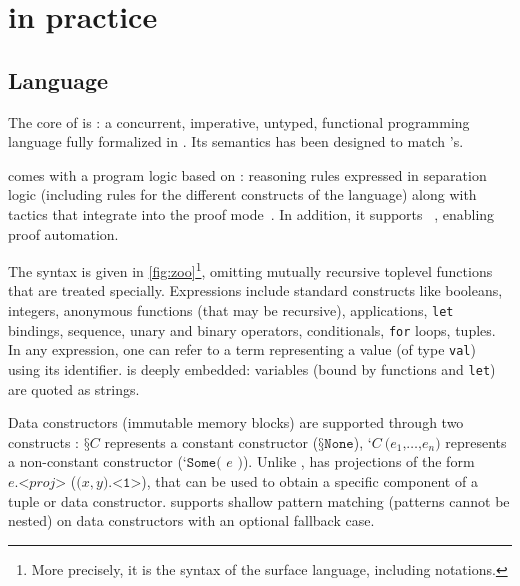 \section{\Zoo in practice}
\label{sec:zoo}




\subsection{Language}

The core of \Zoo is \ZooLang: a concurrent, imperative, untyped, functional programming language fully formalized in \Rocq.
Its semantics has been designed to match \OCaml's.

\ZooLang comes with a program logic based on \Iris: reasoning rules expressed in separation logic (including rules for the different constructs of the language) along with \Rocq tactics that integrate into the \Iris proof mode~\cite{DBLP:conf/popl/KrebbersTB17,DBLP:journals/pacmpl/KrebbersJ0TKTCD18}.
In addition, it supports \Diaframe~\cite{DBLP:conf/pldi/MulderKG22,DBLP:journals/pacmpl/MulderK23}, enabling proof automation.

The \ZooLang syntax is given in \cref{fig:zoo}\footnote{More precisely, it is the syntax of the surface language, including \Rocq notations.}, omitting mutually recursive toplevel functions that are treated specially.
Expressions include standard constructs like booleans, integers, anonymous functions (that may be recursive), applications, \texttt{let} bindings, sequence, unary and binary operators, conditionals, \texttt{for} loops, tuples.
In any expression, one can refer to a \Rocq term representing a \ZooLang value (of type \texttt{val}) using its \Rocq identifier.
\ZooLang is deeply embedded: variables (bound by functions and \texttt{let}) are quoted as strings.

Data constructors (immutable memory blocks) are supported through two constructs : $\texttt{§}C$ represents a constant constructor (\eg $\texttt{§}\texttt{None}$), $\texttt{‘} C\ \texttt{(} e_1 \texttt{,} \dots \texttt{,} e_n \texttt{)}$ represents a non-constant constructor (\eg $\texttt{‘} \texttt{Some( } e \texttt{ )}$).
Unlike \OCaml, \ZooLang has projections of the form $e \texttt{.<} \mathit{proj} \texttt{>}$ (\eg $\texttt{(} x, y \texttt{).<1>}$), that can be used to obtain a specific component of a tuple or data constructor.
\ZooLang supports shallow pattern matching (patterns cannot be nested) on data constructors with an optional fallback case.

